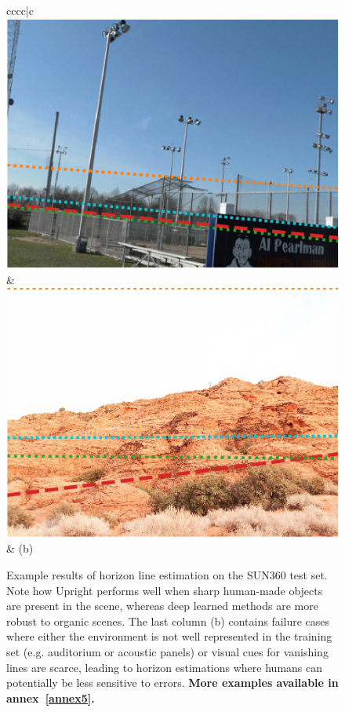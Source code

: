 \begin{figure}
\begin{tabular}{cccc|c}
\includegraphics[width=\exampleresultswidth\linewidth]{figures/method/results/pano_ayfwzaseviqbww_jpg-2.png} &
\includegraphics[width=\exampleresultswidth\linewidth]{figures/method/failures/pano_addyndxkhjhutl_jpg-3.png} \\
 & (b) \\
\end{tabular}
\egroup
\caption[Example results of horizon line estimation]{Example results of horizon line estimation on the SUN360 test set. Note how Upright performs well when sharp human-made objects are present in the scene, whereas deep learned methods are more robust to organic scenes. The last column (b) contains failure cases where either the environment is not well represented in the training set (e.g. auditorium or acoustic panels) or visual cues for vanishing lines are scarce, leading to horizon estimations where humans can potentially be less sensitive to errors. \textbf{More examples available in annex~\ref{annex5}.}}
\label{fig:method_example_results}
\end{figure}

